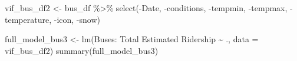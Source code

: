 \documentclass[
  letterpaper,
  DIV=11,
  numbers=noendperiod]{scrartcl}
\newenvironment{Shaded}{\begin{snugshade}}{\end{snugshade}}
\newcommand{\AttributeTok}[1]{\textcolor[rgb]{0.40,0.45,0.13}{#1}}
\newcommand{\FunctionTok}[1]{\textcolor[rgb]{0.28,0.35,0.67}{#1}}
\newcommand{\NormalTok}[1]{\textcolor[rgb]{0.00,0.23,0.31}{#1}}
\newcommand{\OtherTok}[1]{\textcolor[rgb]{0.00,0.23,0.31}{#1}}
\newcommand{\SpecialCharTok}[1]{\textcolor[rgb]{0.37,0.37,0.37}{#1}}
\newcommand{\StringTok}[1]{\textcolor[rgb]{0.13,0.47,0.30}{#1}}
\begin{document}
\begin{Shaded}
\begin{Highlighting}[]
\NormalTok{vif\_bus\_df2 }\OtherTok{\textless{}{-}}  
\NormalTok{  bus\_df }\SpecialCharTok{\%\textgreater{}\%}
  \FunctionTok{select}\NormalTok{(}\SpecialCharTok{{-}}\NormalTok{Date,}
         \SpecialCharTok{{-}}\NormalTok{conditions,}
         \SpecialCharTok{{-}}\NormalTok{tempmin,}
         \SpecialCharTok{{-}}\NormalTok{tempmax,}
         \SpecialCharTok{{-}}\NormalTok{temperature,}
         \SpecialCharTok{{-}}\NormalTok{icon,}
         \SpecialCharTok{{-}}\NormalTok{snow)}

\NormalTok{full\_model\_bus3 }\OtherTok{\textless{}{-}} \FunctionTok{lm}\NormalTok{(}\StringTok{\textasciigrave{}}\AttributeTok{Buses: Total Estimated Ridership}\StringTok{\textasciigrave{}} \SpecialCharTok{\textasciitilde{}}\NormalTok{ ., }\AttributeTok{data =}\NormalTok{ vif\_bus\_df2)}
\FunctionTok{summary}\NormalTok{(full\_model\_bus3)}
\end{Highlighting}
\end{Shaded}
\end{document}
